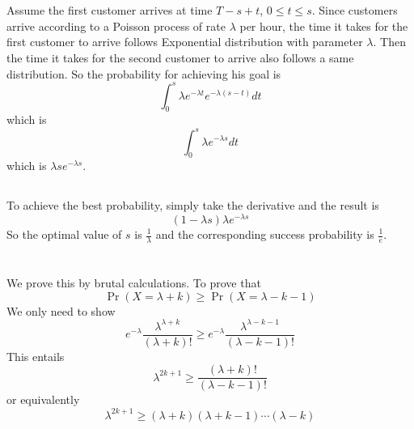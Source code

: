 \documentclass[12pt,letterpaper]{article}
\begin{document}
\section{}
\subsection{}
Assume the first customer arrives at time $T-s+t$, $0 \leq t\leq s$.
Since customers arrive according to a Poisson process of rate $\lambda$ per hour,
the time it takes for the first customer to arrive follows Exponential distribution with parameter $\lambda$.
Then the time it takes for the second customer to arrive also follows a same distribution.
So the probability for achieving his goal is 
$$\int_{0}^{s}\lambda e^{-\lambda t}e^{-\lambda(s-t)}dt$$
which is 
$$\int_{0}^{s}\lambda e^{-\lambda s}dt$$
which is $\lambda se^{-\lambda s}$.
\subsection{}
To achieve the best probability, 
simply take the derivative and the result is 
$$(1-\lambda s)\lambda e^{-\lambda s}$$
So the optimal value of $s$ is $\frac{1}{\lambda}$ 
and the corresponding success probability is $\frac{1}{e}$.

\section{}
\subsection{}
We prove this by brutal calculations.\newline
To prove that $$\Pr(X=\lambda +k)\geq \Pr(X=\lambda -k-1)$$
We only need to show 
$$e^{-\lambda}\frac{\lambda^{\lambda+k}}{(\lambda +k)!}\geq e^{-\lambda}\frac{\lambda^{\lambda-k-1}}{(\lambda -k-1)!}$$
This entails
$$\lambda^{2k+1}\geq \frac{(\lambda +k)!}{(\lambda-k-1)!}$$
or equivalently 
$$\lambda^{2k+1}\geq (\lambda+k)(\lambda+k-1)\cdots (\lambda -k)$$
\subsection{}

\subsection{}
\end{document}
